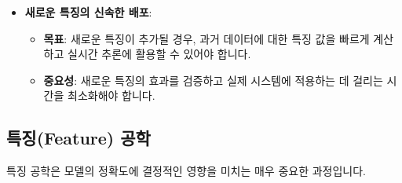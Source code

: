 \documentclass[11pt,a4paper]{article}
\begin{document}
\begin{itemize}
\begin{itemize}
\begin{itemize}
\begin{itemize}
\begin{itemize}
\begin{itemize}
        \item \textbf{목표}: 데이터 과학자들이 새로운 특징(feature)과 규칙(rule)을 쉽게 정의하고 관리하며 배포할 수 있어야 합니다.
        \item \textbf{중요성}: 사기 패턴은 계속 진화하므로, 시스템이 새로운 위협에 신속하게 대응할 수 있도록 유연성이 필요합니다. 기존 시스템은 특징 변경이 매우 어려웠습니다.
    \end{itemize}
    \item \textbf{새로운 특징의 신속한 배포}:
    \begin{itemize}
        \item \textbf{목표}: 새로운 특징이 추가될 경우, 과거 데이터에 대한 특징 값을 빠르게 계산하고 실시간 추론에 활용할 수 있어야 합니다.
        \item \textbf{중요성}: 새로운 특징의 효과를 검증하고 실제 시스템에 적용하는 데 걸리는 시간을 최소화해야 합니다.
    \end{itemize}
\end{itemize}

\subsection*{특징(Feature) 공학}

특징 공학은 모델의 정확도에 결정적인 영향을 미치는 매우 중요한 과정입니다.


\end{itemize}
\end{itemize}
\end{itemize}
\end{itemize}
\end{document}
